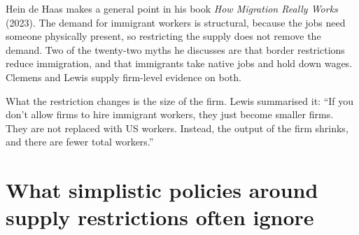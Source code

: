 \documentclass[11pt,a4paper]{article}
\begin{document}
Hein de Haas makes a general point in his book \emph{How Migration Really Works} (2023).
The demand for immigrant workers is structural, because the jobs need someone
physically present, so restricting the supply does not remove the demand. Two of
the twenty-two myths he discusses are that border restrictions reduce immigration, and that
immigrants take native jobs and hold down wages. Clemens and Lewis supply
firm-level evidence on both.

What the restriction changes is the size of the firm. Lewis summarised it: ``If you don't allow firms to hire immigrant workers, they
just become smaller firms. They are not replaced with US workers. Instead, the output of the firm shrinks, and there are fewer total workers.''


\section{What simplistic policies around supply restrictions often ignore}
\label{sec:ignore}
\end{document}
